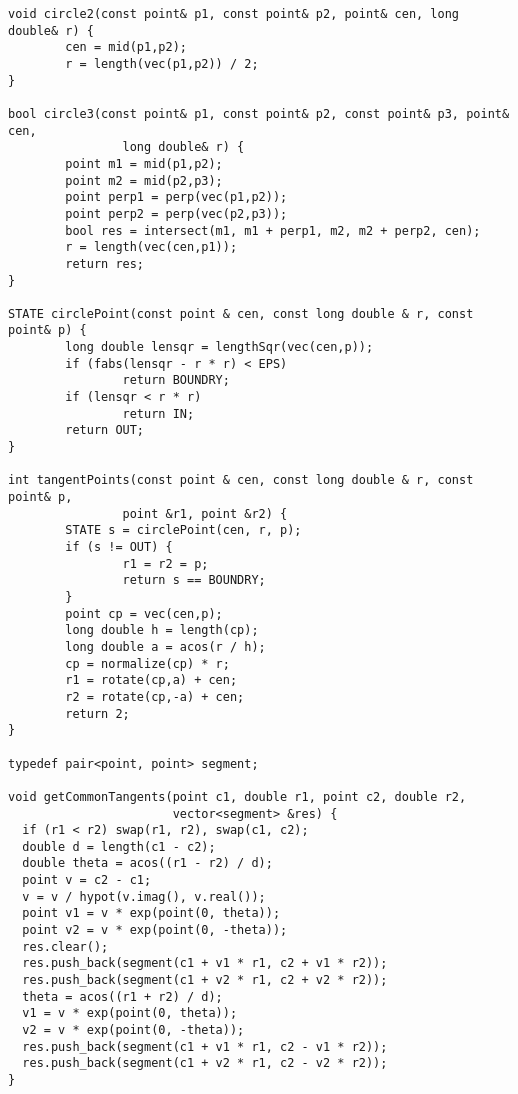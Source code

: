 \documentclass[12pt]{book}
\begin{document}
\begin{verbatim}
void circle2(const point& p1, const point& p2, point& cen, long double& r) {
        cen = mid(p1,p2);
        r = length(vec(p1,p2)) / 2;
}

bool circle3(const point& p1, const point& p2, const point& p3, point& cen,
                long double& r) {
        point m1 = mid(p1,p2);
        point m2 = mid(p2,p3);
        point perp1 = perp(vec(p1,p2));
        point perp2 = perp(vec(p2,p3));
        bool res = intersect(m1, m1 + perp1, m2, m2 + perp2, cen);
        r = length(vec(cen,p1));
        return res;
}

STATE circlePoint(const point & cen, const long double & r, const point& p) {
        long double lensqr = lengthSqr(vec(cen,p));
        if (fabs(lensqr - r * r) < EPS)
                return BOUNDRY;
        if (lensqr < r * r)
                return IN;
        return OUT;
}

int tangentPoints(const point & cen, const long double & r, const point& p,
                point &r1, point &r2) {
        STATE s = circlePoint(cen, r, p);
        if (s != OUT) {
                r1 = r2 = p;
                return s == BOUNDRY;
        }
        point cp = vec(cen,p);
        long double h = length(cp);
        long double a = acos(r / h);
        cp = normalize(cp) * r;
        r1 = rotate(cp,a) + cen;
        r2 = rotate(cp,-a) + cen;
        return 2;
}

typedef pair<point, point> segment;

void getCommonTangents(point c1, double r1, point c2, double r2,
                       vector<segment> &res) {
  if (r1 < r2) swap(r1, r2), swap(c1, c2);
  double d = length(c1 - c2);
  double theta = acos((r1 - r2) / d);
  point v = c2 - c1;
  v = v / hypot(v.imag(), v.real());
  point v1 = v * exp(point(0, theta));
  point v2 = v * exp(point(0, -theta));
  res.clear();
  res.push_back(segment(c1 + v1 * r1, c2 + v1 * r2));
  res.push_back(segment(c1 + v2 * r1, c2 + v2 * r2));
  theta = acos((r1 + r2) / d);
  v1 = v * exp(point(0, theta));
  v2 = v * exp(point(0, -theta));
  res.push_back(segment(c1 + v1 * r1, c2 - v1 * r2));
  res.push_back(segment(c1 + v2 * r1, c2 - v2 * r2));
}
\end{verbatim}
\end{document}
